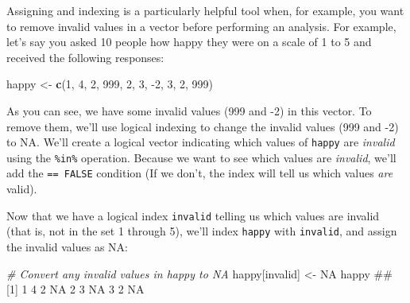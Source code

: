 \documentclass[]{book}
\newenvironment{Shaded}{\begin{snugshade}}{\end{snugshade}}
\newcommand{\KeywordTok}[1]{\textcolor[rgb]{0.13,0.29,0.53}{\textbf{{#1}}}}
\newcommand{\DecValTok}[1]{\textcolor[rgb]{0.00,0.00,0.81}{{#1}}}
\newcommand{\StringTok}[1]{\textcolor[rgb]{0.31,0.60,0.02}{{#1}}}
\newcommand{\CommentTok}[1]{\textcolor[rgb]{0.56,0.35,0.01}{\textit{{#1}}}}
\newcommand{\OtherTok}[1]{\textcolor[rgb]{0.56,0.35,0.01}{{#1}}}
\newcommand{\NormalTok}[1]{{#1}}
\theoremstyle{definition}
\theoremstyle{definition}
\theoremstyle{remark}
\begin{document}
Assigning and indexing is a particularly helpful tool when, for example,
you want to remove invalid values in a vector before performing an
analysis. For example, let's say you asked 10 people how happy they were
on a scale of 1 to 5 and received the following responses:

\begin{Shaded}
\begin{Highlighting}[]
\NormalTok{happy <-}\StringTok{ }\KeywordTok{c}\NormalTok{(}\DecValTok{1}\NormalTok{, }\DecValTok{4}\NormalTok{, }\DecValTok{2}\NormalTok{, }\DecValTok{999}\NormalTok{, }\DecValTok{2}\NormalTok{, }\DecValTok{3}\NormalTok{, -}\DecValTok{2}\NormalTok{, }\DecValTok{3}\NormalTok{, }\DecValTok{2}\NormalTok{, }\DecValTok{999}\NormalTok{)}
\end{Highlighting}
\end{Shaded}

As you can see, we have some invalid values (999 and -2) in this vector.
To remove them, we'll use logical indexing to change the invalid values
(999 and -2) to NA. We'll create a logical vector indicating which
values of \texttt{happy} are \emph{invalid} using the \texttt{\%in\%}
operation. Because we want to see which values are \emph{invalid}, we'll
add the \texttt{==\ FALSE} condition (If we don't, the index will tell
us which values \emph{are} valid).

\begin{Shaded}
\end{Shaded}

Now that we have a logical index \texttt{invalid} telling us which
values are invalid (that is, not in the set 1 through 5), we'll index
\texttt{happy} with \texttt{invalid}, and assign the invalid values as
NA:

\begin{Shaded}
\begin{Highlighting}[]
\CommentTok{# Convert any invalid values in happy to NA}
\NormalTok{happy[invalid] <-}\StringTok{ }\OtherTok{NA}
\NormalTok{happy}
\NormalTok{##  [1]  1  4  2 NA  2  3 NA  3  2 NA}
\end{Highlighting}
\end{Shaded}
\end{document}

